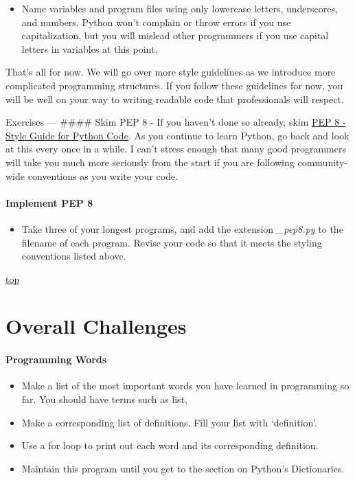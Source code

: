 \documentclass[11pt]{article}
\providecommand{\tightlist}{%
      \setlength{\itemsep}{0pt}\setlength{\parskip}{0pt}}
\begin{document}
\begin{itemize}
\tightlist
\item
  Name variables and program files using only lowercase letters,
  underscores, and numbers. Python won't complain or throw errors if you
  use capitalization, but you will mislead other programmers if you use
  capital letters in variables at this point.
\end{itemize}

That's all for now. We will go over more style guidelines as we
introduce more complicated programming structures. If you follow these
guidelines for now, you will be well on your way to writing readable
code that professionals will respect.

    Exercises --- \#\#\#\# Skim PEP 8 - If you haven't done so already, skim
\href{http://www.python.org/dev/peps/pep-0008/\#block-comments}{PEP 8 -
Style Guide for Python Code}. As you continue to learn Python, go back
and look at this every once in a while. I can't stress enough that many
good programmers will take you much more seriously from the start if you
are following community-wide conventions as you write your code.

\hypertarget{implement-pep-8}{%
\paragraph{Implement PEP 8}\label{implement-pep-8}}

\begin{itemize}
\tightlist
\item
  Take three of your longest programs, and add the extension
  \emph{\_pep8.py} to the filename of each program. Revise your code so
  that it meets the styling conventions listed above.
\end{itemize}

    \protect\hyperlink{}{top}

    \hypertarget{overall-challenges}{%
\section{Overall Challenges}\label{overall-challenges}}

\hypertarget{programming-words}{%
\paragraph{Programming Words}\label{programming-words}}

\begin{itemize}
\tightlist
\item
  Make a list of the most important words you have learned in
  programming so far. You should have terms such as list,
\item
  Make a corresponding list of definitions. Fill your list with
  `definition'.
\item
  Use a for loop to print out each word and its corresponding
  definition.
\item
  Maintain this program until you get to the section on Python's
  Dictionaries.
\end{itemize}
\end{document}
